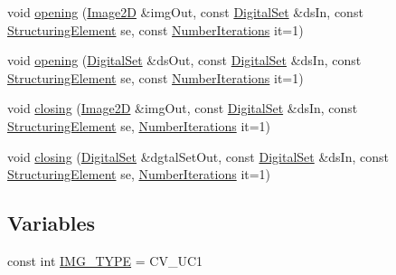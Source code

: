 \begin{DoxyCompactItemize}
void \mbox{\hyperlink{namespaceDIPaCUS_1_1Morphology_a3ee880acb47a35ab065d52ce51a0c99c}{opening}} (\mbox{\hyperlink{namespaceDIPaCUS_1_1Morphology_a9aff9edf28d681accfc54435fbefcbee}{Image2D}} \&img\+Out, const \mbox{\hyperlink{namespaceDIPaCUS_1_1Morphology_ab69fa725716b0ed4c311c0d00a292be7}{Digital\+Set}} \&ds\+In, const \mbox{\hyperlink{structDIPaCUS_1_1Morphology_1_1StructuringElement}{Structuring\+Element}} se, const \mbox{\hyperlink{namespaceDIPaCUS_1_1Morphology_a8ffa7d1c2023be8b21bc87a4b7df7cca}{Number\+Iterations}} it=1)
\item 
void \mbox{\hyperlink{namespaceDIPaCUS_1_1Morphology_ae3b5ddf7edad964159147df450c23783}{opening}} (\mbox{\hyperlink{namespaceDIPaCUS_1_1Morphology_ab69fa725716b0ed4c311c0d00a292be7}{Digital\+Set}} \&ds\+Out, const \mbox{\hyperlink{namespaceDIPaCUS_1_1Morphology_ab69fa725716b0ed4c311c0d00a292be7}{Digital\+Set}} \&ds\+In, const \mbox{\hyperlink{structDIPaCUS_1_1Morphology_1_1StructuringElement}{Structuring\+Element}} se, const \mbox{\hyperlink{namespaceDIPaCUS_1_1Morphology_a8ffa7d1c2023be8b21bc87a4b7df7cca}{Number\+Iterations}} it=1)
\item 
void \mbox{\hyperlink{namespaceDIPaCUS_1_1Morphology_a5855de805a41a85c6e932fe291f3cbed}{closing}} (\mbox{\hyperlink{namespaceDIPaCUS_1_1Morphology_a9aff9edf28d681accfc54435fbefcbee}{Image2D}} \&img\+Out, const \mbox{\hyperlink{namespaceDIPaCUS_1_1Morphology_ab69fa725716b0ed4c311c0d00a292be7}{Digital\+Set}} \&ds\+In, const \mbox{\hyperlink{structDIPaCUS_1_1Morphology_1_1StructuringElement}{Structuring\+Element}} se, \mbox{\hyperlink{namespaceDIPaCUS_1_1Morphology_a8ffa7d1c2023be8b21bc87a4b7df7cca}{Number\+Iterations}} it=1)
\item 
void \mbox{\hyperlink{namespaceDIPaCUS_1_1Morphology_a99255bc91198ef5b6a75a08775d06374}{closing}} (\mbox{\hyperlink{namespaceDIPaCUS_1_1Morphology_ab69fa725716b0ed4c311c0d00a292be7}{Digital\+Set}} \&dgtal\+Set\+Out, const \mbox{\hyperlink{namespaceDIPaCUS_1_1Morphology_ab69fa725716b0ed4c311c0d00a292be7}{Digital\+Set}} \&ds\+In, const \mbox{\hyperlink{structDIPaCUS_1_1Morphology_1_1StructuringElement}{Structuring\+Element}} se, \mbox{\hyperlink{namespaceDIPaCUS_1_1Morphology_a8ffa7d1c2023be8b21bc87a4b7df7cca}{Number\+Iterations}} it=1)
\end{DoxyCompactItemize}
\subsection*{Variables}
\begin{DoxyCompactItemize}
\item 
const int \mbox{\hyperlink{namespaceDIPaCUS_1_1Morphology_ae40d30ec8ea7661ab5ab1c36795837d0}{I\+M\+G\+\_\+\+T\+Y\+PE}} = C\+V\+\_\+U\+C1
\end{DoxyCompactItemize}


